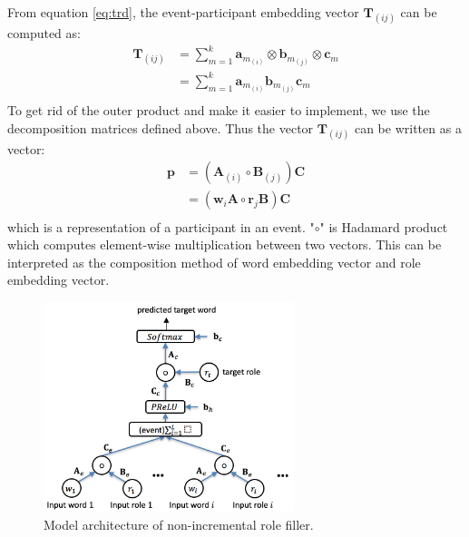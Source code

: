 \documentclass[a4paper]{article}
\begin{document}
From equation \eqref{eq:trd}, the event-participant embedding vector $\mathbf{T}_{(ij)}$ can be computed as: 
\begin{equation} \label{eq:rbwe_tensor}
\begin{aligned}
    \mathbf{T}_{(ij)}
        &= \sum_{m=1}^{k} \mathbf{a}_{m_{(i)}} \otimes \mathbf{b}_{m_{(j)}} \otimes \mathbf{c}_m \\
        &= \sum_{m=1}^{k} \mathbf{a}_{m_{(i)}} \mathbf{b}_{m_{(j)}}  \mathbf{c}_m \\
\end{aligned}
\end{equation}
To get rid of the outer product and make it easier to implement, we use the decomposition matrices defined above. Thus the vector $\mathbf{T}_{(ij)}$ can be written as a vector: 
\begin{equation} \label{eq:rbwe}
\begin{aligned}
    \mathbf{p} 
        &= (\mathbf{A}_{(i)}\circ \mathbf{B}_{(j)}) \mathbf{C} \\
        &= (\mathbf{w}_i \mathbf{A} \circ \mathbf{r}_j \mathbf{B}) \mathbf{C} \\
\end{aligned}
\end{equation}
which is a representation of a participant in an event. "$\circ$" is Hadamard product which computes element-wise multiplication between two vectors. This can be interpreted as the composition method of word embedding vector and role embedding vector. 


\begin{figure}[t]
\centering
\includegraphics[width=0.65\textwidth]{NNRF.png}
\caption{\label{fig:NNRF} Model architecture of non-incremental role filler.}
\end{figure}
\end{document}
